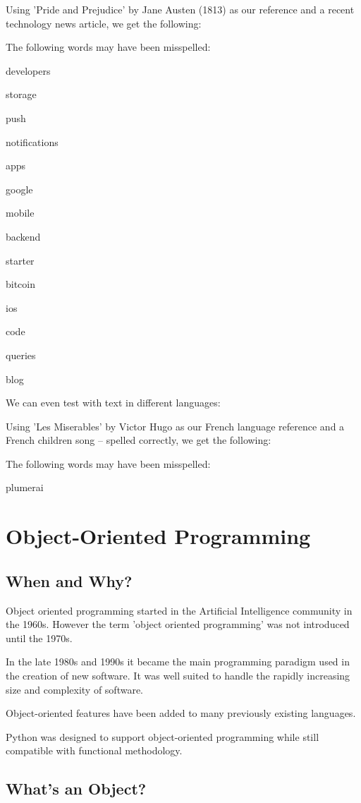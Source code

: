 \documentclass{article}
\begin{document}
Using 'Pride and Prejudice' by Jane Austen (1813) as our reference and a recent technology news article, we get the following:

The following words may have been misspelled:

developers

storage

push

notifications

apps

google

mobile

backend

starter

bitcoin

ios

code

queries

blog

We can even test with text in different languages:

Using 'Les Miserables' by Victor Hugo as our French language reference and a French children song – spelled correctly, we get the following:

The following words may have been misspelled:

plumerai

\section{Object-Oriented Programming}

\subsection{When and Why?}

Object oriented programming started in the Artificial Intelligence community in the 1960s.  However the term 'object oriented programming' was not introduced until the 1970s.

In the late 1980s and 1990s it became the main programming paradigm used in the creation of new software. It was well suited to handle the rapidly increasing size and complexity of software.

Object-oriented features have been added to many previously existing languages.

Python was designed to support object-oriented programming while still compatible with functional methodology. 

\subsection{What's an Object?}
\end{document}
